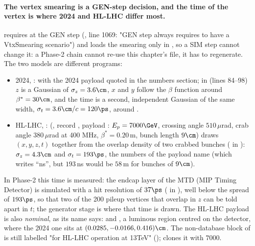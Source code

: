 \paragraph{The vertex smearing is a GEN-step decision, and the time of the vertex is where 2024 and
HL-LHC differ most.}  requires  at the GEN step
(, line 1069: "GEN step always requires to have a
VtxSmearing scenario") and loads the smearing only in , so a SIM step cannot change it: a
Phase-2 chain cannot re-use this chapter's file, it has to regenerate. The two models are different programs:
\begin{itemize}
\item 2024, :  with the 2024 payload quoted in the
  numbers section; in 
  (lines 84--98) $z$ is a Gaussian of $\sigma_z = 3.6\cm$, $x$ and $y$ follow the $\beta$ function around
  $\beta^* = 30\cm$, and the time is a second, independent Gaussian of the same width,
  $\sigma_t = 3.6\cm/c = 120\ps$, around .
\item HL-LHC, : 
  (, record , payload
  : $E_p = 7000\GeV$, crossing angle
  $510\,\mu$rad, crab angle $380\,\mu$rad at 400 MHz, $\beta^* = 0.20\,$m, bunch length $9\cm$)
  draws $(x, y, z, t)$ together from the overlap density of two crabbed bunches ( in
  ): $\sigma_z = 4.3\cm$ and $\sigma_t = 193\ps$, the numbers of the payload
  name (which writes ``ns'', but $193\,$ns would be $58\,$m for bunches of $9\cm$).
\end{itemize}
In Phase-2 this time is measured: the endcap layer of the MTD (MIP Timing Detector) is simulated with a hit resolution of
$37\ps$ ( in
), well below the spread of
$193\ps$, so that two of the 200 pileup vertices that overlap in $z$ can be told apart in $t$; the generator
stage is where that time is drawn. The HL-LHC payload is also \emph{nominal}, as its name says:
 and , a luminous region centred on the detector, where
the 2024 one sits at $(0.0285, -0.0166, 0.416)\cm$. The non-database block 
of  is still labelled "for HL-LHC operation at 13TeV"
();  clones it with $7000$.

